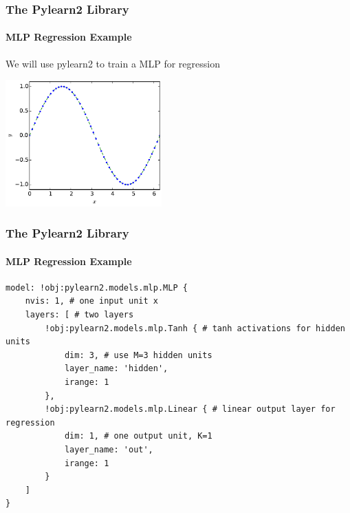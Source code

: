 \documentclass[xetex,professionalfont]{beamer}
\begin{document}

\begin{frame}
\frametitle{The Pylearn2 Library}
\framesubtitle{MLP Regression Example}

We will use pylearn2 to train a MLP for regression

\medskip
\begin{center}
	\includegraphics[width=6cm]{figures/mlp-input.pdf} %
\end{center}

\end{frame}


\begin{frame}[fragile]
\frametitle{The Pylearn2 Library}
\framesubtitle{MLP Regression Example}


\begin{verbatim}
model: !obj:pylearn2.models.mlp.MLP {
    nvis: 1, # one input unit x
    layers: [ # two layers
        !obj:pylearn2.models.mlp.Tanh { # tanh activations for hidden units
            dim: 3, # use M=3 hidden units
            layer_name: 'hidden',
            irange: 1
        },
        !obj:pylearn2.models.mlp.Linear { # linear output layer for regression
            dim: 1, # one output unit, K=1 
            layer_name: 'out',
            irange: 1
        }
    ]
}
\end{verbatim}

\end{frame}


\end{document}
